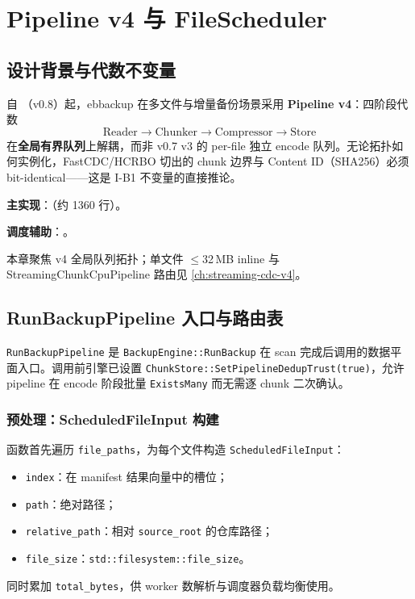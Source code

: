 \chapter{Pipeline v4 与 FileScheduler}
\label{ch:pipeline-v4}

\section{设计背景与代数不变量}

自 （v0.8）起，ebbackup 在多文件与增量备份场景采用 \textbf{Pipeline v4}：四阶段代数
\[
\text{Reader} \rightarrow \text{Chunker} \rightarrow \text{Compressor} \rightarrow \text{Store}
\]
在\textbf{全局有界队列}上解耦，而非 v0.7 v3 的 per-file 独立 encode 队列。无论拓扑如何实例化，FastCDC/HCRBO 切出的 chunk 边界与 Content ID（SHA256）必须 bit-identical——这是 I-B1 不变量的直接推论。

\textbf{主实现}：（约 1360 行）。

\textbf{调度辅助}：。

本章聚焦 v4 全局队列拓扑；单文件 $\leq$32\,MB inline 与 StreamingChunkCpuPipeline 路由见 \cref{ch:streaming-cdc-v4}。

\section{RunBackupPipeline 入口与路由表}

\texttt{RunBackupPipeline} 是 \texttt{BackupEngine::RunBackup} 在 scan 完成后调用的数据平面入口。调用前引擎已设置 \texttt{ChunkStore::SetPipelineDedupTrust(true)}，允许 pipeline 在 encode 阶段批量 \texttt{ExistsMany} 而无需逐 chunk 二次确认。

\subsection{预处理：ScheduledFileInput 构建}

函数首先遍历 \texttt{file\_paths}，为每个文件构造 \texttt{ScheduledFileInput}：
\begin{itemize}[nosep]
  \item \texttt{index}：在 manifest 结果向量中的槽位；
  \item \texttt{path}：绝对路径；
  \item \texttt{relative\_path}：相对 \texttt{source\_root} 的仓库路径；
  \item \texttt{file\_size}：\texttt{std::filesystem::file\_size}。
\end{itemize}
同时累加 \texttt{total\_bytes}，供 worker 数解析与调度器负载均衡使用。

